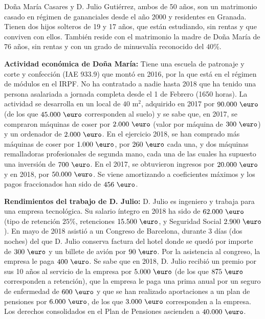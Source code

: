 \documentclass[11pt,a4paper,openany]{article}
\begin{document}
\begin{enunciadoBox}
Doña María Casares y D. Julio Gutiérrez, ambos de 50 años, son un matrimonio casado en régimen de gananciales desde el año 2000 y residentes en Granada. Tienen dos hijos solteros de 19 y 17 años, que están estudiando, sin rentas y que conviven con ellos. También reside con el matrimonio la madre de Doña María de 76 años, sin rentas y con un grado de minusvalía reconocido del $40\%$.

\textbf{Actividad económica de Doña María:} Tiene una escuela de patronaje y corte y confección (IAE 933.9) que montó en 2016, por la que está en el régimen de módulos en el IRPF. No ha contratado a nadie hasta 2018 que ha tenido una persona asalariada a jornada completa desde el 1 de Febrero (1650 horas). La actividad se desarrolla en un local de $40\text{ m}^2$, adquirido en 2017 por $90.000\text{ \euro}$ (de los que $45.000\text{ \euro}$ corresponden al suelo) y se sabe que, en 2017, se compraron máquinas de coser por $2.000\text{ \euro}$ (valor por máquina de $300\text{ \euro}$) y un ordenador de $2.000\text{ \euro}$. En el ejercicio 2018, se han comprado más máquinas de coser por $1.000\text{ \euro}$, por $260\text{ \euro}$ cada una, y dos máquinas remalladoras profesionales de segunda mano, cada una de las cuales ha supuesto una inversión de $700\text{ \euro}$. En el 2017, se obtuvieron ingresos por $20.000\text{ \euro}$ y en 2018, por $50.000\text{ \euro}$. Se viene amortizando a coeficientes máximos y los pagos fraccionados han sido de $456\text{ \euro}$.

\textbf{Rendimientos del trabajo de D. Julio:} D. Julio es ingeniero y trabaja para una empresa tecnológica. Su salario íntegro en 2018 ha sido de $62.000\text{ \euro}$ (tipo de retención $25\%$, retenciones $15.500\text{ \euro}$, y Seguridad Social $2.900\text{ \euro}$). En mayo de 2018 asistió a un Congreso de Barcelona, durante 3 días (dos noches) del que D. Julio conserva factura del hotel donde se quedó por importe de $300\text{ \euro}$ y un billete de avión por $90\text{ \euro}$. Por la asistencia al congreso, la empresa le paga $400\text{ \euro}$.
Se sabe que en 2018, D. Julio recibió un premio por sus 10 años al servicio de la empresa por $5.000\text{ \euro}$ (de los que $875\text{ \euro}$ corresponden a retención), que la empresa le paga una prima anual por un seguro de enfermedad de $600\text{ \euro}$ y que se han realizado aportaciones a un plan de pensiones por $6.000\text{ \euro}$, de los que $3.000\text{ \euro}$ corresponden a la empresa. Los derechos consolidados en el Plan de Pensiones ascienden a $40.000\text{ \euro}$.


\end{enunciadoBox}
\end{document}
